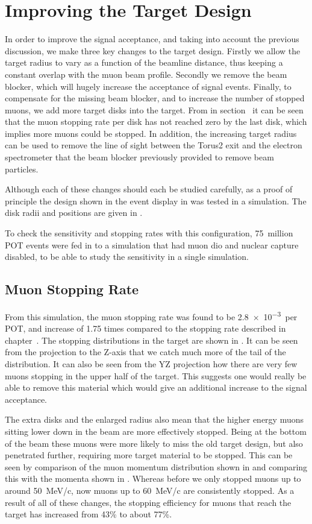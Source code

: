 \section{Improving the Target Design}
In order to improve the signal acceptance, and taking into account the previous discussion, we make three key changes to the target design.
Firstly we allow the target radius to vary as a function of the beamline distance, thus keeping a constant overlap with the muon beam profile.
Secondly we remove the beam blocker, which will hugely increase the acceptance of signal events.
Finally, to compensate for the missing beam blocker, and to increase the number of stopped muons, we add more target disks into the target.
From  in section~ it can be seen that the muon stopping rate per disk has not reached zero by the last disk, which implies more muons could be stopped.
In addition, the increasing target radius can be used to remove the line of sight between the Torus2 exit and the electron spectrometer that the beam blocker previously provided to remove beam particles.

\TabTgtImprovDiskParams
Although each of these changes should each be studied carefully, as a proof of principle the design shown in the event display in  was tested in a simulation.
The disk radii and positions are given in .

To check the sensitivity and stopping rates with this configuration, 75~million POT events were fed in to a simulation that had muon \acf{dio} and nuclear capture disabled, to be able to study the sensitivity in a single simulation.

\subsection{Muon Stopping Rate}
From this simulation, the muon stopping rate was found to be \num{2.8e-3}~per POT, and increase of 1.75 times compared to the stopping rate described in chapter~.
The stopping distributions in the target are shown in .
It can be seen from the projection to the Z-axis that we catch much more of the tail of the distribution.
It can also be seen from the YZ projection how there are very few muons stopping in the upper half of the target. 
This suggests one would really be able to remove this material which would give an additional increase to the signal acceptance.

The extra disks and the enlarged radius also mean that the higher energy muons sitting lower down in the beam are more effectively stopped.
Being at the bottom of the beam these muons were more likely to miss the old target design, but also penetrated further, requiring more target material to be stopped.
This can be seen by comparison of the muon momentum distribution shown in  and comparing this with the momenta shown in .
Whereas before we only stopped muons up to around 50~MeV/c, now muons up to 60~MeV/c are consistently stopped.
As a result of all of these changes, the stopping efficiency for muons that reach the target has increased from 43\% to about 77\%.


